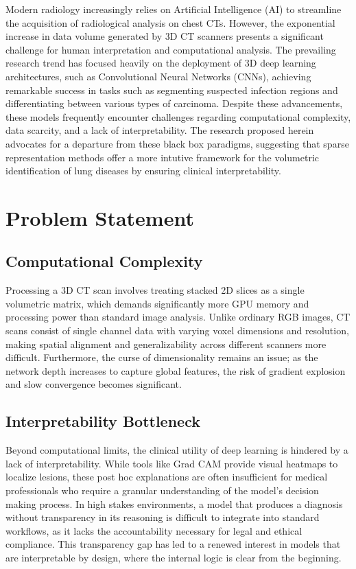 Modern radiology increasingly relies on Artificial Intelligence (AI) to streamline the acquisition of radiological analysis on
chest CTs\cite{Najjar2023Redefining}. However, the exponential increase in data volume generated by 3D CT scanners presents a significant
challenge for human interpretation and computational analysis. The prevailing research trend has focused heavily on the deployment of
3D deep learning architectures, such as Convolutional Neural Networks (CNNs), achieving remarkable success in
tasks such as segmenting suspected infection regions and differentiating between various types of carcinoma\cite{Tiwari2023Comprehensive}.
Despite these advancements, these models frequently encounter challenges regarding computational complexity, data scarcity, and
a lack of interpretability. The research proposed herein advocates for a departure from these black box paradigms, suggesting that
sparse representation methods offer a more intutive framework for the volumetric identification of lung diseases by ensuring clinical interpretability.

\section{Problem Statement}

\subsection{Computational Complexity}
Processing a 3D CT scan involves treating stacked 2D slices as a single volumetric matrix, which demands significantly more GPU
memory and processing power than standard image analysis. Unlike ordinary RGB images, CT scans consist of single channel data with
varying voxel dimensions and resolution, making spatial alignment and generalizability across different scanners more difficult.
Furthermore, the curse of dimensionality remains an issue; as the network depth increases to capture global features,
the risk of gradient explosion and slow convergence becomes significant.

\subsection{Interpretability Bottleneck}
Beyond computational limits, the clinical utility of deep learning is hindered by a lack of interpretability. While tools like
Grad CAM\cite{Selvaraju_2019} provide visual heatmaps to localize lesions, these post hoc explanations are often insufficient for
medical professionals who require a granular understanding of the model's decision making process. In high stakes environments, a
model that produces a diagnosis without transparency in its reasoning is difficult to integrate into standard workflows,
as it lacks the accountability necessary for legal and ethical compliance. This transparency gap has led to a renewed interest in
models that are interpretable by design, where the internal logic is clear from the beginning.

